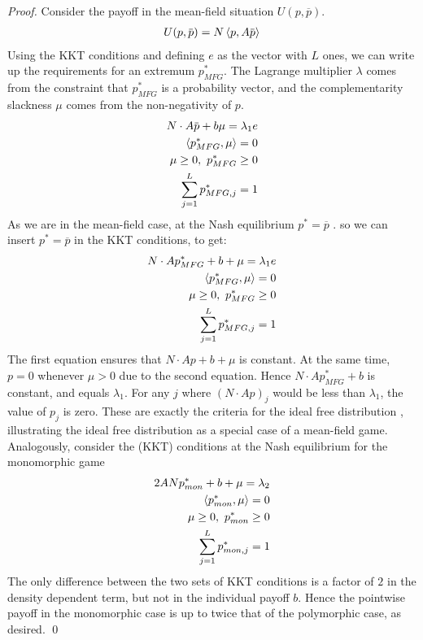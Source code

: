 \begin{proof}
Consider the payoff in the mean-field situation $U(p,\overbar{p})$.
\begin{align}
  U(p, \overbar{p}) = N \ip{p}{A\overbar{p}}
\end{align}
Using the KKT conditions and defining $e$ as the vector with $L$ ones, we can write up the requirements for an extremum $p^*_{MFG}$. The Lagrange multiplier $\lambda$ comes from the constraint that $p^*_{MFG}$ is a probability vector, and the complementarity slackness $\mu$ comes from the non-negativity of $p$. 
\begin{equation}
  \begin{split}
    N \cdot A\overbar{p} + b \mu = \lambda_1 e \\
    \ip{p^*_{MFG}}{\mu} = 0 \\
    \mu \geq 0,~p^*_{MFG} \geq 0 \\
    \sum_{j=1}^L p^*_{MFG,j} = 1
  \end{split}
\end{equation}
As we are in the mean-field case, at the Nash equilibrium $p^* = \overbar{p}$ .
so we can insert $p^*=\overbar{p}$ in the KKT conditions, to get:
\begin{equation}
  \begin{split}
    N \cdot Ap_{MFG}^* + b + \mu =  \lambda_1 e \\
    \left \langle p^*_{MFG},\mu \right \rangle = 0 \\
    \mu \geq 0,~p^*_{MFG} \geq 0 \\
    \sum_{j=1}^L p^*_{MFG,j} = 1
  \end{split}
\end{equation}
The first equation ensures that $N\cdot Ap + b + \mu$ is constant. At the same time, $p=0$ whenever $\mu > 0$ due to the second equation. Hence $N\cdot Ap^*_{MFG} + b$ is constant, and equals $\lambda_1$. For any $j$ where $(N\cdot Ap)_j$ would be less than $\lambda_1$, the value of $p_j$ is zero.
These are exactly the criteria for the ideal free distribution \citep{fretwell1969territorial}, illustrating the ideal free distribution as a special case of a mean-field game.
Analogously, consider the (KKT) conditions at the Nash equilibrium for the monomorphic game
\begin{equation}
  \begin{split}
    2ANp^*_{mon} + b + \mu = \lambda_2  \\
    \left \langle p^*_{mon},\mu \right \rangle = 0 \\
    \mu \geq 0,~p_{mon}^* \geq 0 \\
    \sum_{j=1}^L p^*_{mon,j} = 1
  \end{split}
\end{equation}
The only difference between the two sets of KKT conditions is a factor of $2$ in the density dependent term, but not in the individual payoff $b$. Hence the pointwise payoff in the monomorphic case is up to twice that of the polymorphic case, as desired.
\qed
\end{proof}
